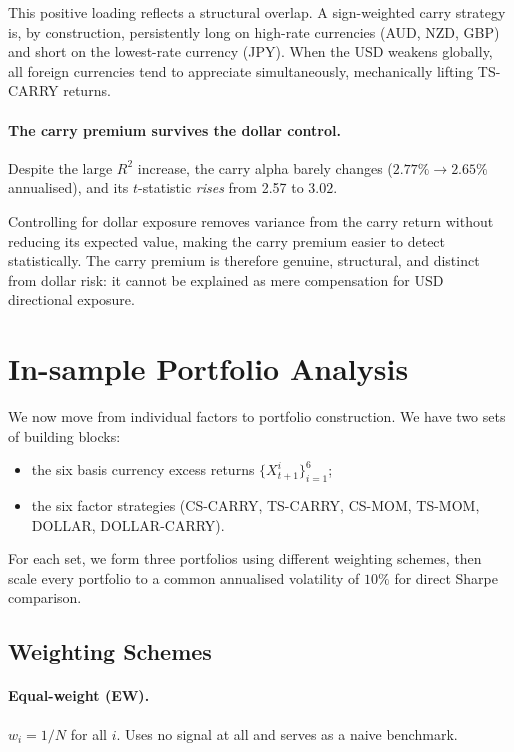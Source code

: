 \documentclass[a4paper,12pt]{article}
\begin{document}
This positive loading reflects a structural overlap. A sign-weighted carry strategy is, by
construction, persistently long on high-rate currencies (AUD, NZD, GBP) and short on the
lowest-rate currency (JPY). When the USD weakens globally, all foreign currencies tend to
appreciate simultaneously, mechanically lifting TS-CARRY returns.

\paragraph{The carry premium survives the dollar control.}
Despite the large $R^2$ increase, the carry alpha barely changes ($2.77\% \to 2.65\%$
annualised), and its $t$-statistic \emph{rises} from 2.57 to $\mathbf{3.02}$.

Controlling for dollar exposure removes variance from the carry return without reducing
its expected value, making the carry premium easier to detect statistically. The carry
premium is therefore genuine, structural, and distinct from dollar risk: it cannot be
explained as mere compensation for USD directional exposure.

\section{In-sample Portfolio Analysis}
\label{sec:insample}

We now move from individual factors to portfolio construction. We have two sets of building
blocks:
\begin{itemize}
    \item the six basis currency excess returns $\{X^i_{t+1}\}_{i=1}^6$;
    \item the six factor strategies (CS-CARRY, TS-CARRY, CS-MOM, TS-MOM, DOLLAR,
          DOLLAR-CARRY).
\end{itemize}

For each set, we form three portfolios using different weighting schemes, then scale every
portfolio to a common annualised volatility of $10\%$ for direct Sharpe comparison.

\subsection{Weighting Schemes}

\paragraph{Equal-weight (EW).}
$w_i = 1/N$ for all $i$. Uses no signal at all and serves as a naive benchmark.
\end{document}

